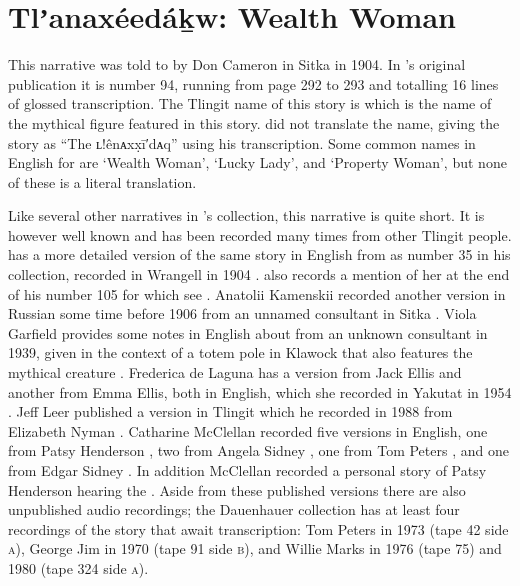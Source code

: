 
\resetexcnt
\chapter{Tlʼanaxéedáḵw: Wealth Woman}\label{ch:94-wealth-woman}

This narrative was told to \citeauthor{swanton:1909} by  Don Cameron in Sitka in 1904.
In \citeauthor{swanton:1909}’s original publication it is number 94, running from page 292 to 293 and totalling 16 lines of glossed transcription.
The Tlingit name of this story is  which is the name of the mythical figure featured in this story.
\citeauthor{swanton:1909} did not translate the name, giving the story as “The ʟ!ênᴀxx̣ī′dᴀq” using his transcription.
Some common names in English for  are ‘Wealth Woman’, ‘Lucky Lady’, and ‘Property Woman’, but none of these is a literal translation.

Like several other narratives in \citeauthor{swanton:1909}’s collection, this narrative is quite short.
It is however well known and has been recorded many times from other Tlingit people.
\citeauthor{swanton:1909} has a more detailed version of the same story in English from  as number 35 in his collection, recorded in Wrangell in 1904 \parencite[173–175]{swanton:1909}.
\citeauthor{swanton:1909} also records a mention of her at the end of his number 105 for which see . 
Anatolii Kamenskii recorded another version in Russian some time before 1906 from an unnamed consultant in Sitka \parencites{kamenskii:1906}[68–70]{kamenskii-kan:1985}.
Viola Garfield provides some notes in English about  from an unknown consultant in 1939, given in the context of a totem pole in Klawock that also features the  mythical creature \parencite[117–118]{garfield-forrest:1948}.
Frederica de Laguna has a version from  Jack Ellis and another from  Emma Ellis, both in English, which she recorded in Yakutat in 1954 \parencite[884]{de-laguna:1972}.
Jeff Leer published a version in Tlingit which he recorded in 1988 from  Elizabeth Nyman \parencite[218–255]{nyman:1993}.
Catharine McClellan recorded five versions in English, one from  Patsy Henderson \parencite[238–241]{mcclellan-cruikshank:2007b}, two from  Angela Sidney \parencite[344–348, 348–353]{mcclellan-cruikshank:2007b}, one from  Tom Peters \parencite[715–719]{mcclellan-cruikshank:2007c}, and one from  Edgar Sidney \parencite[747–753]{mcclellan-cruikshank:2007c}.
In addition McClellan recorded a personal story of  Patsy Henderson hearing the  \parencite[241–244]{mcclellan-cruikshank:2007b}.
Aside from these published versions there are also unpublished audio recordings;
the Dauenhauer collection has at least four recordings of the story that await transcription:  Tom Peters in 1973 (tape 42 side \textsc{a}),  George Jim in 1970 (tape 91 side \textsc{b}), and  Willie Marks in 1976 (tape 75) and 1980 (tape 324 side \textsc{a}).


